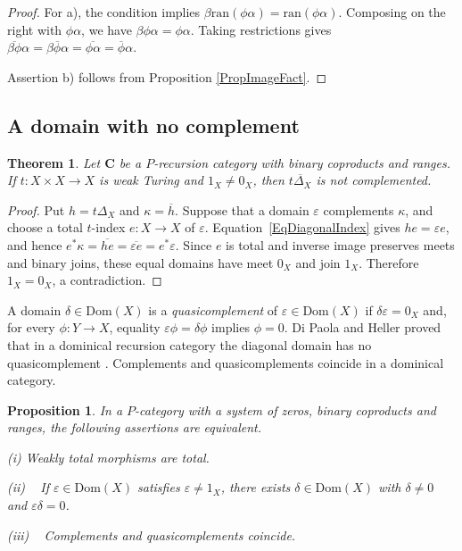 \documentclass[letterpaper,10pt]{amsart}
\theoremstyle{plain}
\newtheorem{thm}{Theorem}[section]
\newtheorem{prop}{Proposition}[thm]
\theoremstyle{definition}
\newcommand{\rst}[1]{\overline{#1}}
\begin{document}
\begin{proof}
For a), the condition implies $\beta\mathrm{ran}(\phi\alpha)=\mathrm{ran}(\phi\alpha)$. Composing on the right with $\phi\alpha$, we have $\beta\phi\alpha=\phi\alpha$. Taking restrictions gives
$\rst{\beta\phi}\alpha=\rst{\beta\phi\alpha}
=\rst{\phi\alpha}=\rst\phi\alpha$.

Assertion b) follows from Proposition \ref{PropImageFact}. 
\end{proof}

\subsection{A domain with no complement}
\begin{thm}\label{ThmNoncomp}
Let $\mathbf C$ be a $P$-recursion category with binary coproducts
and ranges. If $t:X\times X\to X$ is weak Turing and
$1_X\ne0_X$, then $\rst{t\Delta_X}$ is not complemented.
\end{thm}
\begin{proof}
Put $h=t\Delta_X$ and $\kappa=\rst h$. Suppose that a domain
$\varepsilon$ complements $\kappa$, and choose a total $t$-index
$e:X\to X$ of $\varepsilon$. Equation~\eqref{EqDiagonalIndex}
gives $he=\varepsilon e$, and hence
$e^*\kappa=\rst{he}=\rst{\varepsilon e}=e^*\varepsilon$.
Since $e$ is total and inverse image preserves meets and binary joins,
these equal domains have meet $0_X$ and join $1_X$. Therefore
$1_X=0_X$, a contradiction.
\end{proof}

A domain $\delta\in\mathrm{Dom}(X)$ is a \textit{quasicomplement}
of $\varepsilon\in\mathrm{Dom}(X)$ if $\delta\varepsilon=0_X$ and,
for every $\phi:Y\to X$, equality $\varepsilon\phi=\delta\phi$
implies $\phi=0$.
Di Paola and Heller proved that in a dominical recursion category the
diagonal domain has no quasicomplement
\cite[Corollary~8.6]{MR88i:03078}. Complements and quasicomplements
coincide in a dominical category.

\begin{prop}
In a $P$-category with a system of zeros, binary coproducts and ranges, the following assertions are equivalent.

(i) Weakly total morphisms are total.

(ii) ~\cite[Proposition 5.3]{MR88i:03078} If $\varepsilon\in\mathrm{Dom}(X)$ satisfies $\varepsilon\ne1_X$, there exists $\delta\in\mathrm{Dom}(X)$ with $\delta\ne0$ and $\varepsilon\delta=0$.

(iii) ~\cite[Proposition 7.3]{MR88i:03078} Complements and quasicomplements coincide.
\end{prop}
\end{document}
